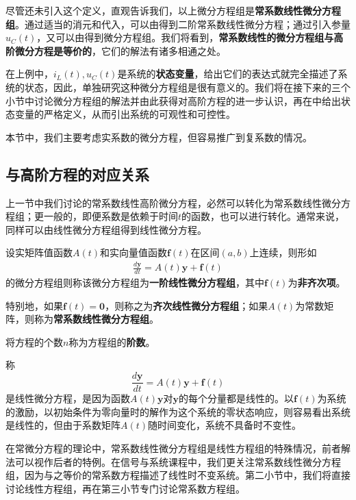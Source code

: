 尽管还未引入这个定义，直观告诉我们，以上微分方程组是\textbf{常系数线性微分方程组}。通过适当的消元和代入，可以由得到二阶常系数线性微分方程；通过引入参量$u_C(t)$，又可以由得到微分方程组。我们将看到，\textbf{常系数线性的微分方程组与高阶微分方程是等价的}，它们的解法有诸多相通之处。

在上例中，$i_L(t),u_C(t)$是系统的\textbf{状态变量}，给出它们的表达式就完全描述了系统的状态，因此，单独研究这种微分方程组是很有意义的。我们将在接下来的三个小节中讨论微分方程组的解法并由此获得对高阶方程的进一步认识，再在中给出状态变量的严格定义，从而引出系统的可观性和可控性。

本节中，我们主要考虑实系数的微分方程，但容易推广到复系数的情况。

\subsection{与高阶方程的对应关系}\label{sub:compare_to_high_order}

上一节中我们讨论的常系数线性高阶微分方程，必然可以转化为常系数线性微分方程组；更一般的，即便系数是依赖于时间$t$的函数，也可以进行转化。通常来说，同样可以由线性微分方程组得到线性微分方程。

\begin{definition}[线性微分方程组]
    设实矩阵值函数$A(t)$和实向量值函数$\mathbf{f}(t)$在区间$(a,b)$上连续，则形如\begin{align*}
    \frac{d\mathbf{y}}{dt}=A(t)\mathbf{y}+\mathbf{f}(t)
    \end{align*}
    的微分方程组则称该微分方程组为\textbf{一阶线性微分方程组}，其中$\mathbf{f}(t)$为\textbf{非齐次项}。

    特别地，如果$\mathbf{f}(t)=\mathbf{0}$，则称之为\textbf{齐次线性微分方程组}；如果$A(t)$为常数矩阵，则称为\textbf{常系数线性微分方程组}。

    将方程的个数$n$称为方程组的\textbf{阶数}。
\end{definition}

称
$$\frac{d\mathbf{y}}{dt}=A(t)\mathbf{y}+\mathbf{f}(t)$$
是线性微分方程，是因为函数$A(t)\mathbf{y}$对$\mathbf{y}$的每个分量都是线性的。以$\mathbf{f}(t)$为系统的激励，以初始条件为零向量时的解作为这个系统的零状态响应，则容易看出系统是线性的，但由于系数矩阵$A(t)$随时间变化，系统不具备时不变性。

在常微分方程的理论中，常系数线性微分方程组是线性方程组的特殊情况，前者解法可以视作后者的特例。在信号与系统课程中，我们更关注常系数线性微分方程组，因为与之等价的常系数方程描述了线性时不变系统。第二小节中，我们将直接讨论线性方程组，再在第三小节专门讨论常系数方程组。

